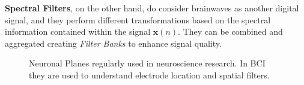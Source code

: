 \textbf{Spectral Filters}, on the other hand, do consider brainwaves as another digital signal, and they perform different transformations based on the spectral information contained within the signal $\mathbf{x}(n)$.  They can be combined and aggregated creating  \textit{Filter Banks} to enhance signal quality. 


\begin{figure}[htb]
\centering
{}
\caption[Neuroanatomical structures of the brain]{Neuronal Planes regularly used in neuroscience research.  In BCI they are used to understand electrode location and spatial filters.}
\label{fig:neuroanatomy}
\end{figure}

